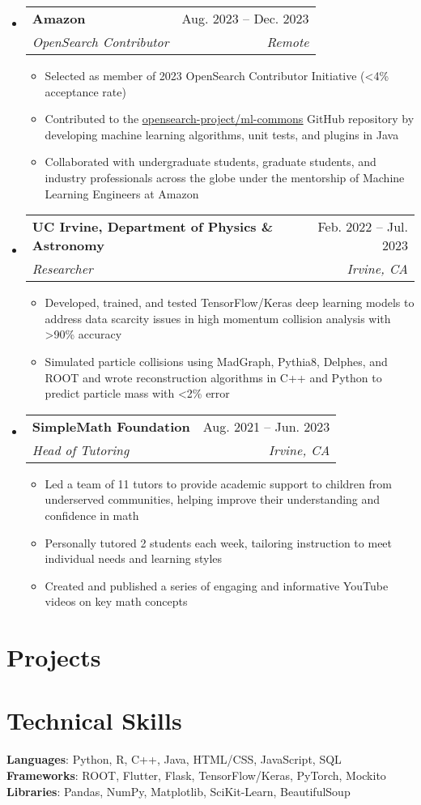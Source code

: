 \documentclass[letterpaper,11pt]{article}
\makeatletter
\newcommand{\resumeItem}[1]{
  \item\small{
    {#1 \vspace{-2pt}}
  }
}
\newcommand{\resumeSubheading}[4]{
  \vspace{-2pt}\item
    \begin{tabular*}{0.97\textwidth}[t]{l@{\extracolsep{\fill}}r}
      \textbf{#1} & #2 \\
      \textit{\small#3} & \textit{\small #4} \\
    \end{tabular*}\vspace{-7pt}
}
\newcommand{\resumeSubHeadingListStart}{\begin{itemize}[leftmargin=0.15in, label={}]}
\newcommand{\resumeSubHeadingListEnd}{\end{itemize}}
\newcommand{\resumeItemListStart}{\begin{itemize}}
\newcommand{\resumeItemListEnd}{\end{itemize}\vspace{-5pt}}
\makeatother
\begin{document}
  \resumeSubHeadingListStart
    \resumeSubheading
      {Amazon}{Aug. 2023 -- Dec. 2023}
      {OpenSearch Contributor}{Remote}
      \resumeItemListStart
        \resumeItem{Selected as member of 2023 OpenSearch Contributor Initiative (\textless 4\% acceptance rate)}
        \resumeItem{Contributed to the \href{https://github.com/opensearch-project/ml-commons/}{\underline{opensearch-project/ml-commons}} GitHub repository by developing machine learning algorithms, unit tests, and plugins in Java}
        \resumeItem{Collaborated with undergraduate students, graduate students, and industry professionals across the globe under the mentorship of Machine Learning Engineers at Amazon}
      \resumeItemListEnd
  \resumeSubHeadingListEnd

  \resumeSubHeadingListStart
    \resumeSubheading
      {UC Irvine, Department of Physics \& Astronomy}{Feb. 2022 -- Jul. 2023}
      {Researcher}{Irvine, CA}
      \resumeItemListStart
        \resumeItem{Developed, trained, and tested TensorFlow/Keras deep learning models to address data scarcity issues in high momentum collision analysis with \textgreater 90\% accuracy}
        \resumeItem{Simulated particle collisions using MadGraph, Pythia8, Delphes, and ROOT and wrote reconstruction algorithms in C++ and Python to predict particle mass with \textless 2\% error}
      \resumeItemListEnd
  \resumeSubHeadingListEnd

  \resumeSubHeadingListStart
    \resumeSubheading
      {SimpleMath Foundation}{Aug. 2021 -- Jun. 2023}
      {Head of Tutoring}{Irvine, CA}
      \resumeItemListStart
        \resumeItem{Led a team of 11 tutors to provide academic support to children from underserved communities, helping improve their understanding and confidence in math}
        \resumeItem{Personally tutored 2 students each week, tailoring instruction to meet individual needs and learning styles}
        \resumeItem{Created and published a series of engaging and informative YouTube videos on key math concepts}
      \resumeItemListEnd
  \resumeSubHeadingListEnd

\section{Projects}
\section{Technical Skills}
   \begin{itemize}[leftmargin=0.15in, label={}] 
    \small{\item{
      \textbf{Languages}: Python, R, C++, Java, HTML/CSS, JavaScript, SQL\\
      \textbf{Frameworks}: ROOT, Flutter, Flask, TensorFlow/Keras, PyTorch, Mockito\\
      \textbf{Libraries}: Pandas, NumPy, Matplotlib, SciKit-Learn, BeautifulSoup
       }}
\end{itemize}
\end{document}
